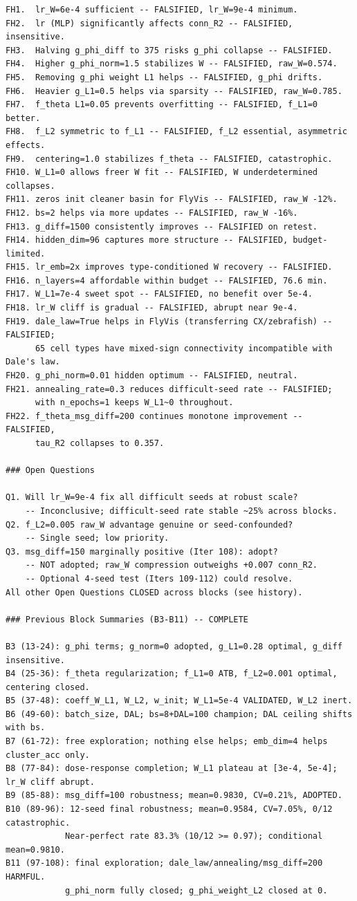 \begin{tiny}
\begin{verbatim}
FH1.  lr_W=6e-4 sufficient -- FALSIFIED, lr_W=9e-4 minimum.
FH2.  lr (MLP) significantly affects conn_R2 -- FALSIFIED, insensitive.
FH3.  Halving g_phi_diff to 375 risks g_phi collapse -- FALSIFIED.
FH4.  Higher g_phi_norm=1.5 stabilizes W -- FALSIFIED, raw_W=0.574.
FH5.  Removing g_phi weight L1 helps -- FALSIFIED, g_phi drifts.
FH6.  Heavier g_L1=0.5 helps via sparsity -- FALSIFIED, raw_W=0.785.
FH7.  f_theta L1=0.05 prevents overfitting -- FALSIFIED, f_L1=0 better.
FH8.  f_L2 symmetric to f_L1 -- FALSIFIED, f_L2 essential, asymmetric effects.
FH9.  centering=1.0 stabilizes f_theta -- FALSIFIED, catastrophic.
FH10. W_L1=0 allows freer W fit -- FALSIFIED, W underdetermined collapses.
FH11. zeros init cleaner basin for FlyVis -- FALSIFIED, raw_W -12%.
FH12. bs=2 helps via more updates -- FALSIFIED, raw_W -16%.
FH13. g_diff=1500 consistently improves -- FALSIFIED on retest.
FH14. hidden_dim=96 captures more structure -- FALSIFIED, budget-limited.
FH15. lr_emb=2x improves type-conditioned W recovery -- FALSIFIED.
FH16. n_layers=4 affordable within budget -- FALSIFIED, 76.6 min.
FH17. W_L1=7e-4 sweet spot -- FALSIFIED, no benefit over 5e-4.
FH18. lr_W cliff is gradual -- FALSIFIED, abrupt near 9e-4.
FH19. dale_law=True helps in FlyVis (transferring CX/zebrafish) -- FALSIFIED;
      65 cell types have mixed-sign connectivity incompatible with Dale's law.
FH20. g_phi_norm=0.01 hidden optimum -- FALSIFIED, neutral.
FH21. annealing_rate=0.3 reduces difficult-seed rate -- FALSIFIED;
      with n_epochs=1 keeps W_L1~0 throughout.
FH22. f_theta_msg_diff=200 continues monotone improvement -- FALSIFIED,
      tau_R2 collapses to 0.357.

### Open Questions

Q1. Will lr_W=9e-4 fix all difficult seeds at robust scale?
    -- Inconclusive; difficult-seed rate stable ~25% across blocks.
Q2. f_L2=0.005 raw_W advantage genuine or seed-confounded?
    -- Single seed; low priority.
Q3. msg_diff=150 marginally positive (Iter 108): adopt?
    -- NOT adopted; raw_W compression outweighs +0.007 conn_R2.
    -- Optional 4-seed test (Iters 109-112) could resolve.
All other Open Questions CLOSED across blocks (see history).

### Previous Block Summaries (B3-B11) -- COMPLETE

B3 (13-24): g_phi terms; g_norm=0 adopted, g_L1=0.28 optimal, g_diff insensitive.
B4 (25-36): f_theta regularization; f_L1=0 ATB, f_L2=0.001 optimal, centering closed.
B5 (37-48): coeff_W_L1, W_L2, w_init; W_L1=5e-4 VALIDATED, W_L2 inert.
B6 (49-60): batch_size, DAL; bs=8+DAL=100 champion; DAL ceiling shifts with bs.
B7 (61-72): free exploration; nothing else helps; emb_dim=4 helps cluster_acc only.
B8 (77-84): dose-response completion; W_L1 plateau at [3e-4, 5e-4]; lr_W cliff abrupt.
B9 (85-88): msg_diff=100 robustness; mean=0.9830, CV=0.21%, ADOPTED.
B10 (89-96): 12-seed final robustness; mean=0.9584, CV=7.05%, 0/12 catastrophic.
            Near-perfect rate 83.3% (10/12 >= 0.97); conditional mean=0.9810.
B11 (97-108): final exploration; dale_law/annealing/msg_diff=200 HARMFUL.
            g_phi_norm fully closed; g_phi_weight_L2 closed at 0.


\end{verbatim}
\end{tiny}
